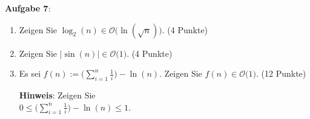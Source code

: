 \documentclass{article}
\begin{document}
\noindent
\textbf{Aufgabe 7}:
\begin{enumerate}
\item Zeigen Sie $\log_2(n) \in \mathcal{O}\bigl(\ln(\sqrt{n})\bigr)$. \hspace*{\fill} (4  Punkte)
\item Zeigen Sie $\bigl|\sin(n)\bigr| \in \mathcal{O}\bigl(1\bigr)$. \hspace*{\fill} (4 Punkte)
\item Es sei 
      $f(n) := \biggl(\sum\limits_{i=1}^n \frac{1}{i}\biggr) - \ln(n)$.
      Zeigen Sie $f(n)\in \mathcal{O}\bigl(1\bigr)$. \hspace*{\fill} (12 Punkte)
      
      \textbf{Hinweis}:  Zeigen Sie 
      \\[0.2cm]
      \hspace*{1.3cm}
      $0 \leq \biggl(\sum\limits_{i=1}^n \frac{1}{i}\biggr) - \ln(n) \leq 1$.
\end{enumerate}
\pagebreak
\end{document}
